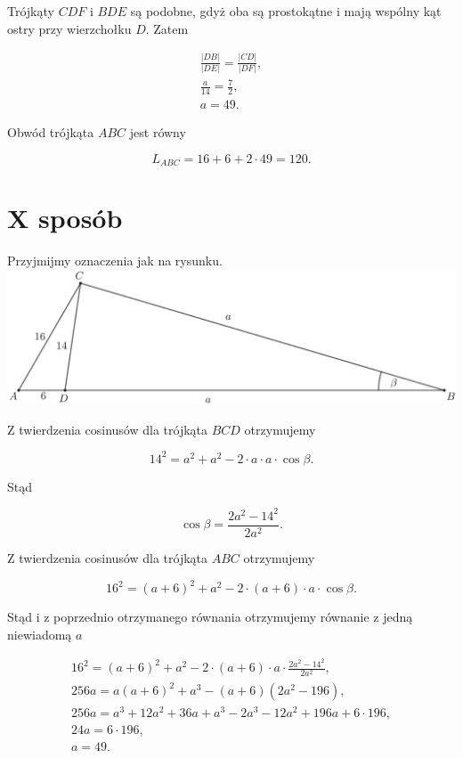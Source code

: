 \documentclass[10pt]{article}
\begin{document}
Trójkąty $C D F$ i $B D E$ są podobne, gdyż oba są prostokątne i mają wspólny kąt ostry przy wierzchołku $D$. Zatem

$$
\begin{gathered}
\frac{|D B|}{|D E|}=\frac{|C D|}{|D F|}, \\
\frac{a}{14}=\frac{7}{2}, \\
a=49 .
\end{gathered}
$$

Obwód trójkąta $A B C$ jest równy

$$
L_{A B C}=16+6+2 \cdot 49=120 .
$$

\section*{X sposób}
Przyjmijmy oznaczenia jak na rysunku.\\
\includegraphics[max width=\textwidth, center]{2025_02_07_d712b9a47aa2c64928dbg-32}

Z twierdzenia cosinusów dla trójkąta $B C D$ otrzymujemy

$$
14^{2}=a^{2}+a^{2}-2 \cdot a \cdot a \cdot \cos \beta .
$$

Stąd

$$
\cos \beta=\frac{2 a^{2}-14^{2}}{2 a^{2}} .
$$

Z twierdzenia cosinusów dla trójkąta $A B C$ otrzymujemy

$$
16^{2}=(a+6)^{2}+a^{2}-2 \cdot(a+6) \cdot a \cdot \cos \beta .
$$

Stąd i z poprzednio otrzymanego równania otrzymujemy równanie z jedną niewiadomą $a$

$$
\begin{gathered}
16^{2}=(a+6)^{2}+a^{2}-2 \cdot(a+6) \cdot a \cdot \frac{2 a^{2}-14^{2}}{2 a^{2}}, \\
256 a=a(a+6)^{2}+a^{3}-(a+6)\left(2 a^{2}-196\right), \\
256 a=a^{3}+12 a^{2}+36 a+a^{3}-2 a^{3}-12 a^{2}+196 a+6 \cdot 196, \\
24 a=6 \cdot 196, \\
a=49 .
\end{gathered}
$$
\end{document}
